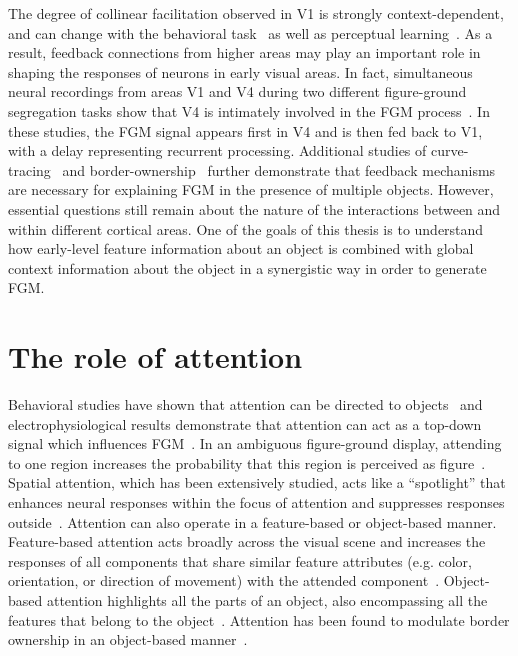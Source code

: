 The degree of collinear facilitation observed in V1 is strongly context-dependent, and can change with the behavioral task~\citep{Li_etal04, Li_etal06} as well as perceptual learning~\citep{Li_etal08a, Yan_etal14}. As a result, feedback connections from higher areas may play an important role in shaping the responses of neurons in early visual areas. In fact, simultaneous neural recordings from areas V1 and V4 during two different figure-ground segregation tasks show that V4 is intimately involved in the FGM process~\citep{Poort_etal12, Chen_etal14}. In these studies, the FGM signal appears first in V4 and is then fed back to V1, with a delay representing recurrent processing. Additional studies of curve-tracing~\citep{Roelfsema_etal98} and border-ownership~\citep{Zhou_etal00, Qiu_etal07, Zhang_vonderHeydt10} further demonstrate that feedback mechanisms are necessary for explaining FGM in the presence of multiple objects. However, essential questions still remain about the nature of the interactions between and within different cortical areas. One of the goals of this thesis is to understand how early-level feature information about an object is combined with global context information about the object in a synergistic way in order to generate FGM.

\section{The role of attention}

Behavioral studies have shown that attention can be directed to objects~\citep{Egly_etal94} and electrophysiological results demonstrate that attention can act as a top-down signal which influences FGM~\citep{Qiu_etal07, Poort_etal12}. In an ambiguous figure-ground display, attending to one region increases the probability that this region is perceived as figure~\citep{Driver_Baylis96, Vecera_etal04}. Spatial attention, which has been extensively studied, acts like a ``spotlight'' that enhances neural responses within the focus of attention and suppresses responses outside~\citep{Motter93a}. Attention can also operate in a feature-based or object-based manner. Feature-based attention acts broadly across the visual scene and increases the responses of all components that share similar feature attributes (e.g. color, orientation, or direction of movement) with the attended component~\citep{Treue_Trujillo99}. Object-based attention highlights all the parts of an object, also encompassing all the features that belong to the object~\citep{Roelfsema_etal98, Schoenfeld_etal14}. Attention has been found to modulate border ownership in an object-based manner~\citep{Qiu_etal07}.

